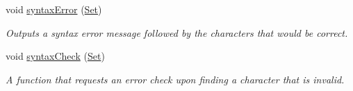 \begin{DoxyCompactItemize}
void \hyperlink{classParser_a705ca7e2357f506dc5bea989e40ca11f}{syntaxError} (\hyperlink{classSet}{Set})
\begin{DoxyCompactList}\small\item\em Outputs a syntax error message followed by the characters that would be correct. \item\end{DoxyCompactList}\item 
void \hyperlink{classParser_a61a1e512e33d3498f45d1e6f7c7aaf4d}{syntaxCheck} (\hyperlink{classSet}{Set})
\begin{DoxyCompactList}\small\item\em A function that requests an error check upon finding a character that is invalid. \item\end{DoxyCompactList}\end{DoxyCompactItemize}
